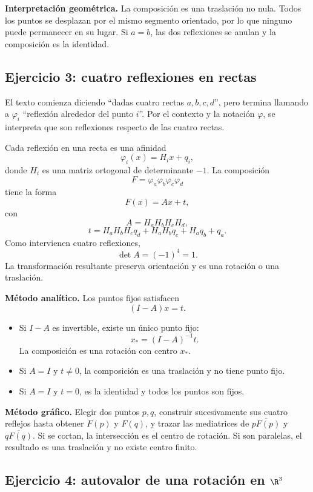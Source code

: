 \textbf{Interpretación geométrica.} La composición es una traslación no nula. Todos los puntos
se desplazan por el mismo segmento orientado, por lo que ninguno puede permanecer en su lugar.
Si \(a=b\), las dos reflexiones se anulan y la composición es la identidad.

\subsection{Ejercicio 3: cuatro reflexiones en rectas}

\begin{atencion}
El texto comienza diciendo ``dadas cuatro rectas \(a,b,c,d\)'', pero termina llamando a
\(\varphi_i\) ``reflexión alrededor del punto \(i\)''. Por el contexto y la notación
\(\varphi\), se interpreta que son reflexiones respecto de las cuatro rectas.
\end{atencion}

Cada reflexión en una recta es una afinidad
\[
  \varphi_i(x)=H_ix+q_i,
\]
donde \(H_i\) es una matriz ortogonal de determinante \(-1\). La composición
\[
  F=\varphi_a\varphi_b\varphi_c\varphi_d
\]
tiene la forma
\[
  F(x)=Ax+t,
\]
con
\[
  A=H_aH_bH_cH_d,
\]
\[
  t=H_aH_bH_cq_d+H_aH_bq_c+H_aq_b+q_a.
\]
Como intervienen cuatro reflexiones,
\[
  \det A=(-1)^4=1.
\]
La transformación resultante preserva orientación y es una rotación o una traslación.

\textbf{Método analítico.} Los puntos fijos satisfacen
\[
  (I-A)x=t.
\]
\begin{itemize}
  \item Si \(I-A\) es invertible, existe un único punto fijo:
  \[
    \boxed{x_\ast=(I-A)^{-1}t}.
  \]
  La composición es una rotación con centro \(x_\ast\).
  \item Si \(A=I\) y \(t\neq0\), la composición es una traslación y no tiene punto fijo.
  \item Si \(A=I\) y \(t=0\), es la identidad y todos los puntos son fijos.
\end{itemize}

\textbf{Método gráfico.} Elegir dos puntos \(p,q\), construir sucesivamente sus cuatro
reflejos hasta obtener \(F(p)\) y \(F(q)\), y trazar las mediatrices de
\(\overline{pF(p)}\) y \(\overline{qF(q)}\). Si se cortan, la intersección es el centro de
rotación. Si son paralelas, el resultado es una traslación y no existe centro finito.

\subsection{Ejercicio 4: autovalor de una rotación en \(\R^3\)}

